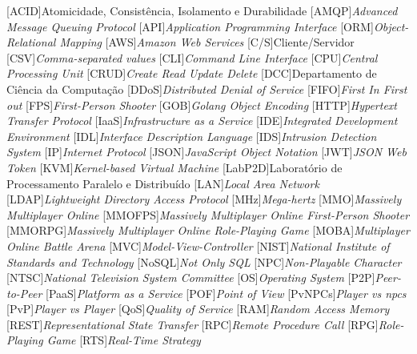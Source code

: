 \begin{acronym}[]
	[ACID]{{Atomicidade, Consistência, Isolamento e Durabilidade}}
	[AMQP]{{\it Advanced Message Queuing Protocol}}
	[API]{{\it Application Programming Interface}}
	[ORM]{{\it Object-Relational Mapping}}
  	[AWS]{{\it Amazon Web Services}}
	[C/S]{{Cliente/Servidor}}
	[CSV]{{\it Comma-separated values}}
	[CLI]{{\it Command Line Interface}}
	[CPU]{{\it Central Processing Unit}}
	[CRUD]{{\it Create Read Update Delete}}
	[DCC]{{Departamento de Ciência da Computação}}
	[DDoS]{{\it Distributed Denial of Service}}
	[FIFO]{{\it First In First out}}
	[FPS]{{\it First-Person Shooter}}
	[GOB]{{\it Golang Object Encoding}}
	[HTTP]{{\it Hypertext Transfer Protocol}}
	[IaaS]{{\it Infrastructure as a Service}}
	[IDE]{{\it Integrated Development Environment}}
	[IDL]{{\it Interface Description Language}}
	[IDS]{{\it Intrusion Detection System}}
	[IP]{{\it Internet Protocol}}
	[JSON]{{\it JavaScript Object Notation}}
	[JWT]{{\it JSON Web Token}}
	[KVM]{{\it Kernel-based Virtual Machine}}
	[LabP2D]{{Laboratório de Processamento Paralelo e Distribuído}}
	[LAN]{{\it Local Area Network}}
  	[LDAP]{{\it Lightweight Directory Access Protocol}}
	[MHz]{{\it Mega-hertz}}
	[MMO]{{\it Massively Multiplayer Online}}
	[MMOFPS]{{\it Massively Multiplayer Online First-Person Shooter}}
	[MMORPG]{{\it Massively Multiplayer Online Role-Playing Game}}
	[MOBA]{{\it Multiplayer Online Battle Arena}}
	[MVC]{{\it Model-View-Controller}}
	[NIST]{{\it National Institute of Standards and Technology}}
	[NoSQL]{{\it Not Only SQL}}
	[NPC]{{\it Non-Playable Character}}
	[NTSC]{{\it National Television System Committee}}
	[OS]{{\it Operating System}}
	[P2P]{{\it Peer-to-Peer}}
	[PaaS]{{\it Platform as a Service}}
	[POF]{{\it Point of View}}
	[PvNPCs]{{\it Player vs \acp{npc}}}
	[PvP]{{\it Player vs Player}}
	[QoS]{{\it Quality of Service}}
	[RAM]{{\it Random Access Memory}}
	[REST]{{\it Representational State Transfer}}
	[RPC]{{\it Remote Procedure Call}}
	[RPG]{{\it Role-Playing Game}}
	[RTS]{{\it Real-Time Strategy}}

\end{acronym}
